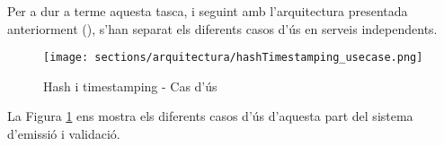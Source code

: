 \newline Per a dur a terme aquesta tasca, i seguint amb l'arquitectura presentada anteriorment (), s'han separat els diferents casos d'ús en serveis independents.
\begin{figure}[h]
\texttt{[image: sections/arquitectura/hashTimestamping\_usecase.png]}
\centering
\caption{Hash i timestamping - Cas d'ús}
\label{fig:hash_timestamping_usecase}
\end{figure}
\newline La Figura \ref{fig:hash_timestamping_usecase} ens mostra els diferents casos d'ús d'aquesta part del sistema d'emissió i validació.\\
%
%
